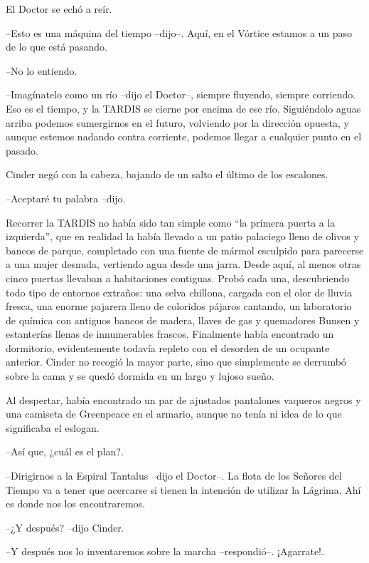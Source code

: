 El Doctor se echó a reír. 



--Esto es una máquina del tiempo --dijo--. Aquí, en el Vórtice estamos a un paso de lo que está pasando.

--No lo entiendo.

--Imagínatelo como un río --dijo el Doctor--, siempre fluyendo, siempre corriendo. Eso es el tiempo, y la TARDIS se cierne por encima de ese río. Siguiéndolo aguas arriba podemos sumergirnos en el futuro, volviendo por la dirección opuesta, y aunque estemos nadando contra corriente, podemos llegar a cualquier punto en el pasado.

Cinder negó con la cabeza, bajando de un salto el último de los escalones. 



--Aceptaré tu palabra --dijo.



Recorrer la TARDIS no había sido tan simple como ``la primera puerta a la izquierda'', que en realidad la había llevado a un patio palaciego lleno de olivos y bancos de parque, completado con una fuente de mármol esculpido para parecerse a una mujer desnuda, vertiendo agua desde una jarra. Desde aquí, al menos otras cinco puertas llevaban a habitaciones contiguas. Probó cada una, descubriendo todo tipo de entornos extraños: una selva chillona, cargada con el olor de lluvia fresca, una enorme pajarera lleno de coloridos pájaros cantando, un laboratorio de química con antiguos bancos de madera, llaves de gas y quemadores Bunsen y estanterías llenas de innumerables frascos. Finalmente había encontrado un dormitorio, evidentemente todavía repleto con el desorden de un ocupante anterior. Cinder no recogió la mayor parte, sino que simplemente se derrumbó sobre la cama y se quedó dormida en un largo y lujoso sueño.

Al despertar, había encontrado un par de ajustados pantalones vaqueros negros y una camiseta de Greenpeace en el armario, aunque no tenía ni idea de lo que significaba el eslogan.



--Así que, ¿cuál es el plan?.

--Dirigirnos a la Espiral Tantalus --dijo el Doctor--. La flota de los Señores del Tiempo va a tener que acercarse si tienen la intención de utilizar la Lágrima. Ahí es donde nos los encontraremos.

--¿Y después? --dijo Cinder.

--Y después nos lo inventaremos sobre la marcha --respondió--. ¡Agarrate!.




